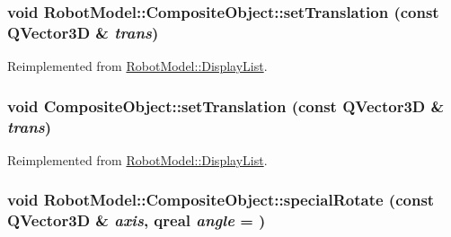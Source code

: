 \label{class_robot_model_1_1_composite_object_abd48ac40b21178f5306ddfa6c92ea3c3}
\hypertarget{class_robot_model_1_1_composite_object_a6a24e273234d2919c48d36182c409ffd}{
\subsubsection[{setTranslation}]{\setlength{\rightskip}{0pt plus 5cm}void RobotModel::CompositeObject::setTranslation (const QVector3D \& {\em trans})}}
\label{class_robot_model_1_1_composite_object_a6a24e273234d2919c48d36182c409ffd}


Reimplemented from \hyperlink{class_robot_model_1_1_display_list_a6c9c1298e237ab25037ad9d7163b118c}{RobotModel::DisplayList}.\hypertarget{class_robot_model_1_1_composite_object_ae925e59246174c9d3b74d459b32835e3}{
\subsubsection[{setTranslation}]{\setlength{\rightskip}{0pt plus 5cm}void CompositeObject::setTranslation (const QVector3D \& {\em trans})}}
\label{class_robot_model_1_1_composite_object_ae925e59246174c9d3b74d459b32835e3}


Reimplemented from \hyperlink{class_robot_model_1_1_display_list_a6c9c1298e237ab25037ad9d7163b118c}{RobotModel::DisplayList}.\hypertarget{class_robot_model_1_1_composite_object_a3e9c7e78a85dc50e5327d5b5c99cc67e}{
\subsubsection[{specialRotate}]{\setlength{\rightskip}{0pt plus 5cm}void RobotModel::CompositeObject::specialRotate (const QVector3D \& {\em axis}, \/  qreal {\em angle} = {})}}
\label{class_robot_model_1_1_composite_object_a3e9c7e78a85dc50e5327d5b5c99cc67e}



